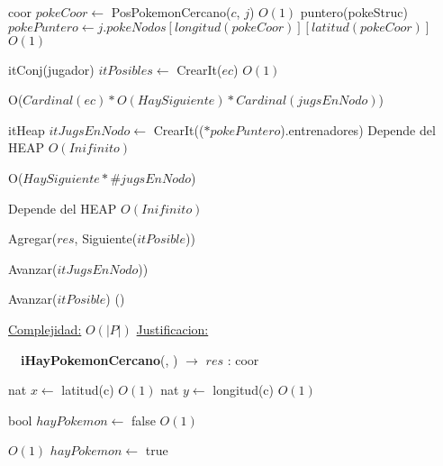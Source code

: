 \begin{Algoritmos}
\begin{algorithm}[H]
\begin{algorithmic}[1]
\State coor $pokeCoor \gets$ PosPokemonCercano($c$, $j$) \Comment $O(1)$
\State puntero(pokeStruc) $pokePuntero \gets j.pokeNodos[longitud(pokeCoor)][latitud(pokeCoor)]$ \Comment $O(1)$

\State itConj(jugador) $itPosibles \gets$ CrearIt($ec$) \Comment $O(1)$

   \Comment O($Cardinal(ec) * O(HaySiguiente) * Cardinal(jugsEnNodo)$)
    
    \State itHeap $itJugsEnNodo \gets$ CrearIt(($*pokePuntero$).entrenadores)     \Comment Depende del HEAP $O(Inifinito)$
    
       \Comment O($HaySiguiente * \#jugsEnNodo$)

           \Comment Depende del HEAP $O(Inifinito)$
        
            \State Agregar($res$, Siguiente($itPosible$))
    
        \EndIf
        
        \State Avanzar($itJugsEnNodo$))
    
    \EndWhile
    
    \State Avanzar($itPosible$)   \Comment()



\EndWhile


\medskip
\State \underline{Complejidad:} $O(|P|)$
\State \underline{Justificacion:} 

\end{algorithmic}
\end{algorithm}


$ $\newline
$ $\newline
$ $\newline
{\textbf{iHayPokemonCercano}(, ) $\to$ $res$ : coor}
\begin{algorithmic}[1]

\State nat $x \gets$ latitud(c)    \Comment $O(1)$
\State nat $y \gets$ longitud(c)   \Comment $O(1)$


\State bool $hayPokemon \gets$ false    \Comment $O(1)$

     \Comment $O(1)$
    \State $hayPokemon \gets$ true
\EndIf


\end{algorithmic}
\end{Algoritmos}
